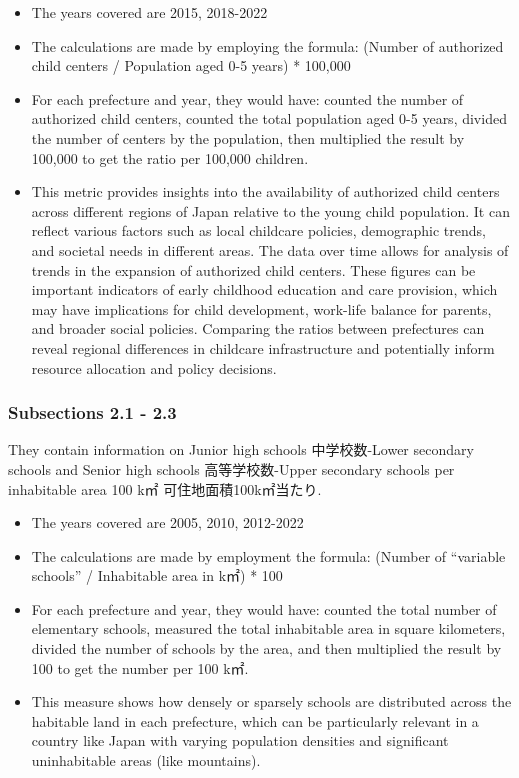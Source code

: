 \documentclass[
]{ltjarticle}
\begin{document}
\begin{itemize}
\item
  The years covered are 2015, 2018-2022
\item
  The calculations are made by employing the formula: (Number of
  authorized child centers / Population aged 0-5 years) * 100,000
\item
  For each prefecture and year, they would have: counted the number of
  authorized child centers, counted the total population aged 0-5 years,
  divided the number of centers by the population, then multiplied the
  result by 100,000 to get the ratio per 100,000 children.
\item
  This metric provides insights into the availability of authorized
  child centers across different regions of Japan relative to the young
  child population. It can reflect various factors such as local
  childcare policies, demographic trends, and societal needs in
  different areas. The data over time allows for analysis of trends in
  the expansion of authorized child centers. These figures can be
  important indicators of early childhood education and care provision,
  which may have implications for child development, work-life balance
  for parents, and broader social policies. Comparing the ratios between
  prefectures can reveal regional differences in childcare
  infrastructure and potentially inform resource allocation and policy
  decisions.
\end{itemize}

\hypertarget{subsections-2.1---2.3}{%
\subsubsection{Subsections 2.1 - 2.3}\label{subsections-2.1---2.3}}

They contain information on Junior high schools 中学校数-Lower secondary
schools and Senior high schools 高等学校数-Upper secondary schools per
inhabitable area 100 k㎡ 可住地面積100k㎡当たり.

\begin{itemize}
\item
  The years covered are 2005, 2010, 2012-2022
\item
  The calculations are made by employment the formula: (Number of
  ``variable schools'' / Inhabitable area in k㎡) * 100
\item
  For each prefecture and year, they would have: counted the total
  number of elementary schools, measured the total inhabitable area in
  square kilometers, divided the number of schools by the area, and then
  multiplied the result by 100 to get the number per 100 k㎡.
\item
  This measure shows how densely or sparsely schools are distributed
  across the habitable land in each prefecture, which can be
  particularly relevant in a country like Japan with varying population
  densities and significant uninhabitable areas (like mountains).
\end{itemize}
\end{document}
